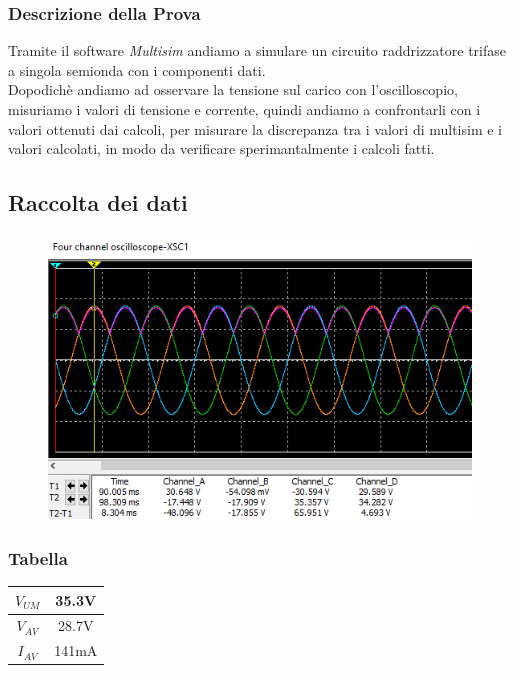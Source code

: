 \documentclass[12pt]{article}
\begin{document}
\subsubsection{Descrizione della Prova}
Tramite il software \textit{Multisim} andiamo a simulare un circuito raddrizzatore trifase a singola semionda con i componenti dati.\\
Dopodichè andiamo ad osservare la tensione sul carico con l'oscilloscopio, misuriamo i valori di tensione
e corrente, quindi andiamo a confrontarli con i valori ottenuti dai calcoli, per misurare la discrepanza tra i valori di multisim e i valori calcolati, in modo da verificare sperimantalmente
i calcoli fatti.\\
\subsection{Raccolta dei dati}
\begin{figure}[!h]
    \centering
    \includegraphics[scale=1]{oscsing.PNG}
\end{figure}
\subsubsection{Tabella}
\begin{table}[ht]
    \centering
    \begin{tabular}{|c|c|}
        \hline
        \rowcolor{RoyalBlue!80}     $V_{UM}$ & 35.3V\\\hline
        \rowcolor{ForestGreen!80}   $V_{AV}$ & 28.7V\\\hline
        \rowcolor{Goldenrod!80}        $I_{AV}$ & 141mA\\\hline
    \end{tabular}
\end{table}
\end{document}
